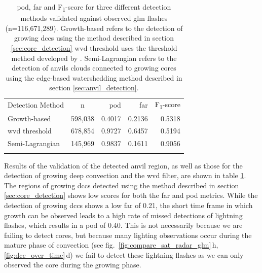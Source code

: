 \begin{table}[tb]
\centering
\begin{tabular}{lcrrr}
\tophline
Detection Method            & n         & \acrshort{pod}    & \acrshort{far}    & F\textsubscript{1}-score \\ 
\middlehline
Growth-based                & 598,038   & 0.4017            & 0.2136            & 0.5318  \\
\acrshort{wvd} threshold    & 678,854   & 0.9727            & 0.6457            & 0.5194  \\
Semi-Lagrangian             & 145,969   & 0.9837            & 0.1611            & 0.9056 \\
\bottomhline
\end{tabular}
\caption[
\acrshort{pod}, \acrshort{far} and F\textsubscript{1}-score for three different detection methods validated against observed \acrshort{glm} flashes
]{
\acrshort{pod}, \acrshort{far} and F\textsubscript{1}-score for three different detection methods validated against observed \acrshort{glm} flashes (n=116,671,289). Growth-based refers to the detection of growing \acrshort{dcc}s using the method described in section \ref{sec:core_detection} \acrshort{wvd} threshold uses the threshold method developed by \citet{muller_role_2018}. Semi-Lagrangian refers to the detection of anvils clouds connected to growing cores using the edge-based watershedding method described in section \ref{sec:anvil_detection}.
} %
\label{table:validation}
\end{table}


Results of the validation of the detected anvil region, as well as those for the detection of growing deep convection and the \acrshort{wvd} filter, are shown in table \ref{table:validation}.
The regions of growing \acrshort{dcc}s detected using the method described in section \ref{sec:core_detection} shows low scores for both the \acrshort{far} and \acrshort{pod} metrics.
While the detection of growing \acrshort{dcc}s shows a low \acrshort{far} of 0.21, the short time frame in which growth can be observed leads to a high rate of missed detections of lightning flashes, which results in a \acrshort{pod} of 0.40.
This is not necessarily because we are failing to detect cores, but because many lighting observations occur during the mature phase of convection (see fig.~\ref{fig:compare_sat_radar_glm}\,h, \ref{fig:dcc_over_time}\,d) we fail to detect these lightning flashes as we can only observed the core during the growing phase.

